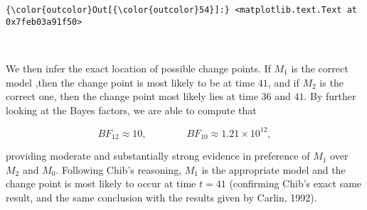 \documentclass{article}
\begin{document}
            \begin{Verbatim}[commandchars=\\\{\}]
{\color{outcolor}Out[{\color{outcolor}54}]:} <matplotlib.text.Text at 0x7feb03a91f50>
\end{Verbatim}
        
    \begin{center}
    \end{center}
    { \hspace*{\fill} \\}
    
    We then infer the exact location of possible change points. If $M_1$ is
the correct model ,then the change point is most likely to be at time
$41$, and if $M_2$ is the correct one, then the change point most likely
lies at time $36$ and $41$. By further looking at the Bayes factors, we
are able to compute that

\[BF_{12}\approx 10,\qquad\qquad BF_{10}\approx 1.21\times 10^{12},\]

providing moderate and substantially strong evidence in preference of
$M_1$ over $M_2$ and $M_0$. Following Chib's reasoning, $M_1$ is the
appropriate model and the change point is most likely to occur at time
$t=41$ (confirming Chib's exact same result, and the same conclusion
with the results given by Carlin, 1992).
\end{document}
